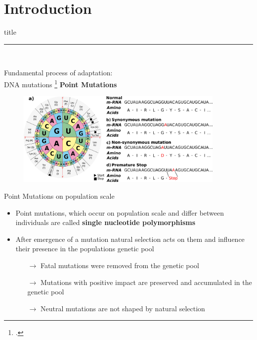 \documentclass{beamer}
\begin{document}
\section{Introduction}
\begin{frame}[plain]
    \vfill
    \centering
    \begin{beamercolorbox}[sep=8pt,center,shadow=true,rounded=true]{title}
      \insertsectionhead\par%
      \noindent\rule{10cm}{1pt} \\
    \end{beamercolorbox}
    \vfill
\end{frame}
\begin{frame}{Fundamental process of adaptation:\\ DNA mutations \footcite{bresch2013}}
	\textbf{Point Mutations}
	\begin{figure}[tb]
		\centering
		\begin{minipage}[h]{1\textwidth}
		\centering
		\includegraphics[width=0.9\textwidth]{images/Mutations.png}
		\label{fig:Mutations}
		\end{minipage}
	\end{figure}
\end{frame}
\begin{frame}{Point Mutations on population scale}
	\begin{itemize}
		\item Point mutations, which occur on population scale and differ between individuals are called \textbf{single nucleotide polymorphisms}
		\item After emergence of a mutation natural selection acts on them and influence their presence in the populations genetic pool 
		\begin{itemize}
			\item[$\rightarrow$] Fatal mutations were removed from the genetic pool
			\item[$\rightarrow$] Mutations with positive impact are preserved and accumulated in the genetic pool
			\item[$\rightarrow$] Neutral mutations are not shaped by natural selection
		\end{itemize}
	\end{itemize}
\end{frame}	
\end{document}
